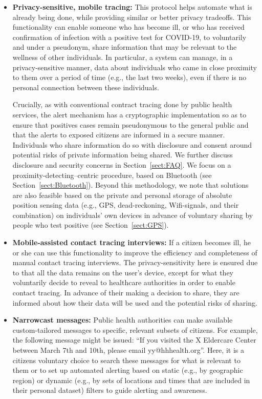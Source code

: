 \documentclass{article}
\begin{document}
\begin{itemize}
\item \textbf{Privacy-sensitive, mobile tracing:}  This protocol helps automate what is already being done, while providing similar or better privacy tradeoffs.
This functionality can enable someone who has become ill, or who has received confirmation of infection with a positive test for COVID-19, to voluntarily and under a pseudonym, share information that may be relevant to the wellness of other individuals.  In particular, a system can manage, in a privacy-sensitive manner, data about individuals who came in close proximity to them over a period of time (e.g., the last two weeks), even if there is no personal connection between these individuals.

Crucially, as with conventional contract tracing done by public health services, the alert mechanism has a cryptographic implementation so as to ensure that positives cases remain pseudonymous to the general public and that the alerts to exposed citizens are informed in a secure manner. Individuals who share information do so with disclosure and consent around potential risks of private information being shared. We further discuss disclosure and security concerns in Section~\ref{sect:FAQ}. We focus on a proximity-detecting--centric procedure, based on Bluetooth (see Section~\ref{sect:Bluetooth}). Beyond this methodology, we note that solutions are also feasible based on the private and personal storage of absolute position sensing data (e.g., GPS, dead-reckoning, Wifi-signals, and their combination) on individuals' own devices in advance of voluntary sharing by people who test positive (see Section~\ref{sect:GPS}).


\item \textbf{Mobile-assisted contact tracing interviews:}  If a citizen becomes ill, he or she can use this functionality to improve the efficiency and completeness of manual contact tracing interviews. The privacy-sensitivity here is ensured due to that all the data remains on the user's device, except for what they voluntarily decide to reveal to healthcare authorities in order to enable contact tracing. In advance of their making a decision to share, they are informed about how their data will be used and the potential risks of sharing.

\item \textbf{Narrowcast messages:}  Public health authorities can make available
  custom-tailored messages to specific, relevant subsets of citizens.  For example, the following message might be issued: ``If you visited
  the X Eldercare Center between March 7th and 10th, please email yy@hhhealth.org''.  Here, it is a citizens voluntary choice to search these messages for what is relevant to them or to set up automated alerting based on static (e.g., by geographic region) or dynamic (e.g., by sets of locations and times that are included in their personal dataset) filters to guide alerting and awareness.
  
\end{itemize}
\end{document}
